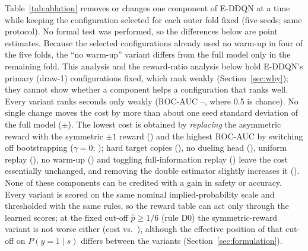 Table~\ref{tab:ablation} removes or changes one component of E-DDQN at a time while keeping the configuration selected for each outer fold fixed (five seeds; same protocol). No formal test was performed, so the differences below are point estimates. Because the selected configurations already used no warm-up in four of the five folds, the ``no warm-up'' variant differs from the full model only in the remaining fold. This analysis and the reward-ratio analysis below hold E-DDQN's primary (draw-1) configurations fixed, which rank weakly (Section~\ref{sec:why}); they cannot show whether a component helps a configuration that ranks well. Every variant ranks seconds only weakly (ROC-AUC \AblSoftCostRocAuc--\AblGammaZeroCostRocAuc, where 0.5 is chance). No single change moves the cost by more than about one seed standard deviation of the full model (\EDDQNCostCostMean$\pm$\EDDQNCostCostSD). The lowest cost is obtained by \emph{replacing} the asymmetric reward with the symmetric $\pm1$ reward (\AblAsymCostCost) and the highest ROC-AUC by switching off bootstrapping ($\gamma=0$; \AblGammaZeroCostRocAuc); hard target copies (\AblSoftCostCost), no dueling head (\AblDuelCostCost), uniform replay (\AblBalCostCost), no warm-up (\AblWarmCostCost) and toggling full-information replay (\AblFullCostCost) leave the cost essentially unchanged, and removing the double estimator slightly increases it (\AblDoubleCostCost). None of these components can be credited with a gain in safety or accuracy. Every variant is scored on the same nominal implied-probability scale and thresholded with the same rules, so the reward table can act only through the learned scores; at the fixed cut-off $\hat p\ge1/6$ (rule D0) the symmetric-reward variant is not worse either (cost \AblAsymBayesCost{} vs.\ \EDDQNBayesCostMean), although the effective position of that cut-off on $P(y=1\mid s)$ differs between the variants (Section~\ref{sec:formulation}).

\begin{table}[t]
\centering
\caption{Leave-one-component-out ablation of E-DDQN (selected configuration per outer fold held fixed; rule D1; mean over 5 seeds, cost $\pm$ SD). The no-warm-up variant changes only the one fold whose selected configuration used warm-up.}
\label{tab:ablation}
\footnotesize

\end{table}


